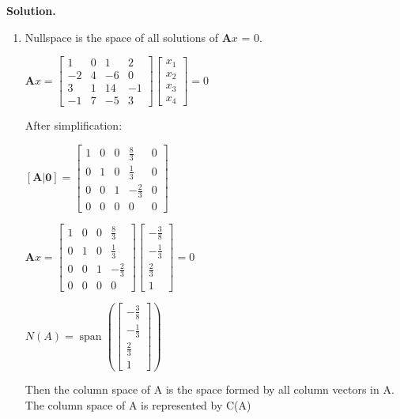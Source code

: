 \documentclass[english,onecolumn]{IEEEtran}
\begin{document}
\noindent\textbf{Solution.}
\begin{enumerate}
    \item Nullspace is the space of all solutions  of $\mathbf{A}x$ = 0.
    
    $\mathbf{A}x = 
    \left[\begin{array}{cccc}
    	1 & 0 & 1 & 2\\
    	-2 & 4 & -6 & 0\\
    	3 & 1 & 14 & -1\\
    	-1 & 7 & -5 &3 
    \end{array}\right]
	\left[\begin{array}{c}
		x_1\\
		x_2\\
		x_3\\
		x_4 
	\end{array}\right]=0
$ 

After simplification:

    $[\mathbf{A| 0}] = 
\left[\begin{array}{cccc|c}
	1 & 0 & 0 & \frac{8}{3} &0\\
	0 & 1 & 0 & \frac{1}{3} &0\\
	0 & 0 & 1 & -\frac{2}{3} &0\\
	0 & 0 & 0 & 0 &0
\end{array}\right]
$

    $\mathbf{A}x = 
\left[\begin{array}{cccc}
	1 & 0 & 0 & \frac{8}{3}\\
	0 & 1 & 0 & \frac{1}{3}\\
	0 & 0 & 1 & -\frac{2}{3}\\
	0 & 0 & 0 & 0
\end{array}\right]
\left[\begin{array}{c}
	-\frac{3}{8}\\
	-\frac{1}{3}\\
	\frac{2}{3}\\
	1 
\end{array}\right]=0
$ 

$
	N(A)=\operatorname{span}\left(\left[\begin{array}{c}
	-\frac{3}{8}\\
-\frac{1}{3}\\
\frac{2}{3}\\
1 
	\end{array}\right]\right)
$

Then the column space of A is the space formed by all column vectors in A. The column space of A is represented by C(A)


\end{enumerate}
\end{document}
